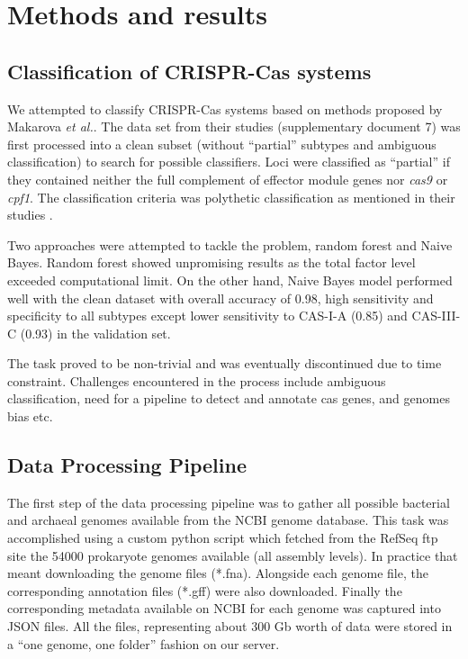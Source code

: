 \documentclass[11pt, a4paper,titlepage]{article}
\begin{document}
\section{Methods and results}

\subsection{Classification of CRISPR-Cas systems}
We attempted to classify CRISPR-Cas systems based on methods proposed
by Makarova \emph{et al.}. The data set from their studies (supplementary document
7) was first processed into a clean subset (without “partial” subtypes
and ambiguous classification) to search for possible classifiers. Loci
were classified as “partial” if they contained neither the full
complement of effector module genes nor \emph{cas9} or \emph{cpf1}. The
classification criteria was polythetic classification as mentioned in
their studies \cite{makarova2015updated}.

Two approaches were attempted to tackle the problem, random forest and
Naive Bayes. Random forest showed unpromising results as the total
factor level exceeded computational limit. On the other hand, Naive
Bayes model performed well with the clean dataset with overall
accuracy of 0.98, high sensitivity and specificity to all subtypes
except lower sensitivity to CAS-I-A (0.85) and CAS-III-C (0.93) in the
validation set.

The task proved to be non-trivial and was eventually discontinued due
to time constraint. Challenges encountered in the process include
ambiguous classification, need for a pipeline to detect and annotate
cas genes, and genomes bias etc.

\subsection{Data Processing Pipeline}

The first step of the data processing pipeline was to gather all
possible bacterial and archaeal genomes available from the NCBI genome
database. This task was accomplished using a custom python script
which fetched from the RefSeq ftp site \cite{pruitt2007ncbi} the 54000
prokaryote genomes available (all assembly levels). In practice that
meant downloading the genome files (*.fna). Alongside each genome
file, the corresponding annotation files (*.gff) were also
downloaded. Finally the corresponding metadata available on NCBI for
each genome was captured into JSON files. All the files, representing
about 300 Gb worth of data were stored in a ``one genome, one folder''
fashion on our server.
\end{document}

